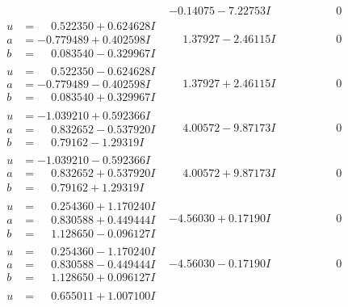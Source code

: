 \documentclass[1p]{elsarticle_modified}
\theoremstyle{definition}
\begin{document}
$$\begin{array}{c|c|c}
 & -0.14075 - 7.22753 I & \phantom{-0.000000 } 0 \\ \hline\begin{aligned}
u &= \phantom{-}0.522350 + 0.624628 I \\
a &= -0.779489 + 0.402598 I \\
b &= \phantom{-}0.083540 - 0.329967 I\end{aligned}
 & \phantom{-}1.37927 - 2.46115 I & \phantom{-0.000000 } 0 \\ \hline\begin{aligned}
u &= \phantom{-}0.522350 - 0.624628 I \\
a &= -0.779489 - 0.402598 I \\
b &= \phantom{-}0.083540 + 0.329967 I\end{aligned}
 & \phantom{-}1.37927 + 2.46115 I & \phantom{-0.000000 } 0 \\ \hline\begin{aligned}
u &= -1.039210 + 0.592366 I \\
a &= \phantom{-}0.832652 - 0.537920 I \\
b &= \phantom{-}0.79162 - 1.29319 I\end{aligned}
 & \phantom{-}4.00572 - 9.87173 I & \phantom{-0.000000 } 0 \\ \hline\begin{aligned}
u &= -1.039210 - 0.592366 I \\
a &= \phantom{-}0.832652 + 0.537920 I \\
b &= \phantom{-}0.79162 + 1.29319 I\end{aligned}
 & \phantom{-}4.00572 + 9.87173 I & \phantom{-0.000000 } 0 \\ \hline\begin{aligned}
u &= \phantom{-}0.254360 + 1.170240 I \\
a &= \phantom{-}0.830588 + 0.449444 I \\
b &= \phantom{-}1.128650 - 0.096127 I\end{aligned}
 & -4.56030 + 0.17190 I & \phantom{-0.000000 } 0 \\ \hline\begin{aligned}
u &= \phantom{-}0.254360 - 1.170240 I \\
a &= \phantom{-}0.830588 - 0.449444 I \\
b &= \phantom{-}1.128650 + 0.096127 I\end{aligned}
 & -4.56030 - 0.17190 I & \phantom{-0.000000 } 0 \\ \hline\begin{aligned}
u &= \phantom{-}0.655011 + 1.007100 I \\

\end{aligned}
\end{array}$$
\end{document}
